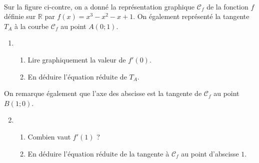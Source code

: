 \documentclass[11pt]{article}
\begin{document}
\begin{exo}~\\
  \begin{minipage}{.5\textwidth}
    Sur la figure ci-contre, on a donné la représentation graphique $\mathcal
    C_f$ de la
    fonction $f$ définie sur $\mathbb{R}$ par $f(x) = x^3-x^2-x+1$. On également
    représenté la tangente $T_A$ à la courbe $\mathcal C_f$ au point $A(0; 1)$.
    \begin{enumerate}
      \item \begin{enumerate}
          \item Lire graphiquement la valeur de $f'(0)$.
          \item En déduire l'équation réduite de $T_A$.
        \end{enumerate}
    \end{enumerate}
    On remarque également que l'axe des abscisse est la tangente de $\mathcal
    C_f$ au point $B(1; 0)$.
    \begin{enumerate}
        \setcounter{enumi}{1}
      \item \begin{enumerate}
          \item Combien vaut $f'(1)$ ?
          \item En déduire l'équation réduite de la tangente à $\mathcal C_f$ au
            point d'abscisse $1$.
        \end{enumerate}
    \end{enumerate}
  \end{minipage}
  \begin{minipage}{.5\textwidth}
\begin{center}
\end{center}
  \end{minipage}
\end{exo}
\end{document}
